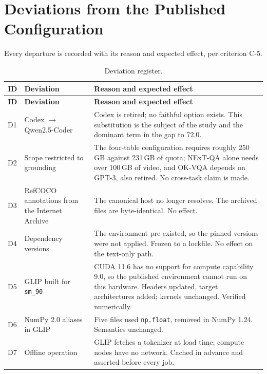 \documentclass[12pt,a4paper,oneside]{report}
\begin{document}
\chapter{Deviations from the Published Configuration}
\label{ch:deviations}

Every departure is recorded with its reason and expected effect, per criterion C-5.

\begin{longtable}{@{}p{}p{}p{}@{}}
\caption{Deviation register.}\label{tab:deviations}\\
\toprule
\textbf{ID} & \textbf{Deviation} & \textbf{Reason and expected effect} \\
\midrule
\endfirsthead
\toprule
\textbf{ID} & \textbf{Deviation} & \textbf{Reason and expected effect} \\
\midrule
\endhead
\bottomrule
\endfoot

D1 & Codex $\to$ Qwen2.5-Coder & Codex is retired; no faithful option exists. This
substitution is the subject of the study and the dominant term in the gap to $72.0$. \\

D2 & Scope restricted to grounding & The four-table configuration requires roughly
250\,GB against 231\,GB of quota; NExT-QA alone needs over 100\,GB of video, and OK-VQA
depends on GPT-3, also retired. No cross-task claim is made. \\

D3 & RefCOCO annotations from the Internet Archive & The canonical host no longer
resolves. The archived files are byte-identical. No effect. \\

D4 & Dependency versions & The environment pre-existed, so the pinned versions were not
applied. Frozen to a lockfile. No effect on the text-only path. \\

D5 & GLIP built for \texttt{sm\_90} & CUDA 11.6 has no support for compute capability
9.0, so the published environment cannot run on this hardware. Headers updated, target
architectures added; kernels unchanged. Verified numerically. \\

D6 & NumPy 2.0 aliases in GLIP & Five files used \texttt{np.float}, removed in NumPy
1.24. Semantics unchanged. \\

D7 & Offline operation & GLIP fetches a tokenizer at load time; compute nodes have no
network. Cached in advance and asserted before every job. \\


\end{longtable}
\end{document}
